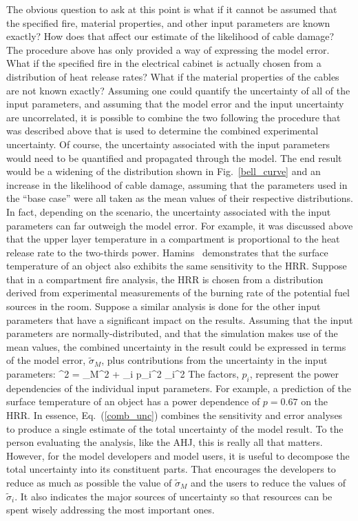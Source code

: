 The obvious question to ask at this point is what if it cannot be assumed that the specified fire, material properties, and other input parameters are
known exactly? How does that affect our estimate of the likelihood of cable damage? The procedure above has only provided a way of expressing the model
error. What if the specified fire in the electrical cabinet is actually chosen from a distribution of heat release rates?
What if the material properties of the cables are not known exactly? Assuming one could quantify the uncertainty of all of the input parameters, and assuming that the model error
and the input uncertainty are uncorrelated, it is possible to combine the two following the procedure that was described above that is used to determine the combined
experimental uncertainty. Of
course, the uncertainty associated with the input parameters would need to be quantified and propagated through the model. The end result would be a widening of
the distribution shown in Fig.~\ref{bell_curve} and an increase in the likelihood of cable damage, assuming that the parameters used in the ``base case'' were
all taken as the mean values of their respective distributions. In fact, depending on the scenario, the uncertainty associated with the input parameters can far outweigh
the model error. For example, it was discussed above that the upper layer temperature in a compartment is proportional to the heat release rate to the two-thirds power.
Hamins~\cite{NUREG_1824} demonstrates that the surface temperature of an object also exhibits the same sensitivity to the HRR. Suppose that in a compartment fire
analysis, the HRR is chosen from a distribution derived from experimental measurements of the burning rate of the potential fuel sources in the room. Suppose a similar
analysis is done for the other input parameters that have a significant impact on the results. Assuming that the
input parameters are normally-distributed, and that the
simulation makes use of the mean values, the combined uncertainty in the result could
be expressed in terms of the model error, $\widetilde{\sigma}_M$, plus contributions from the uncertainty in the input parameters:
\be
   \widetilde{\sigma}^2 = \widetilde{\sigma}_M^2 + \sum_i p_i^2 \widetilde{\sigma}_i^2  \label{comb_unc}
\ee
The factors, $p_i$, represent the power dependencies of the individual input parameters. For example, a prediction of the surface temperature of an object has a power dependence of
$p=0.67$ on the HRR. In essence, Eq.~(\ref{comb_unc}) combines the sensitivity and error analyses to produce a single estimate of the total uncertainty of the
model result. To the person evaluating the analysis, like the AHJ, this is really all that matters. However, for the model developers and model users, it is useful to
decompose the total uncertainty into its constituent parts. That encourages the developers to reduce as much as possible the value of $\widetilde{\sigma}_M$ and the users to reduce
the values of $\widetilde{\sigma}_i$. It also indicates the major sources of uncertainty so that resources can be spent wisely addressing the most important ones.



